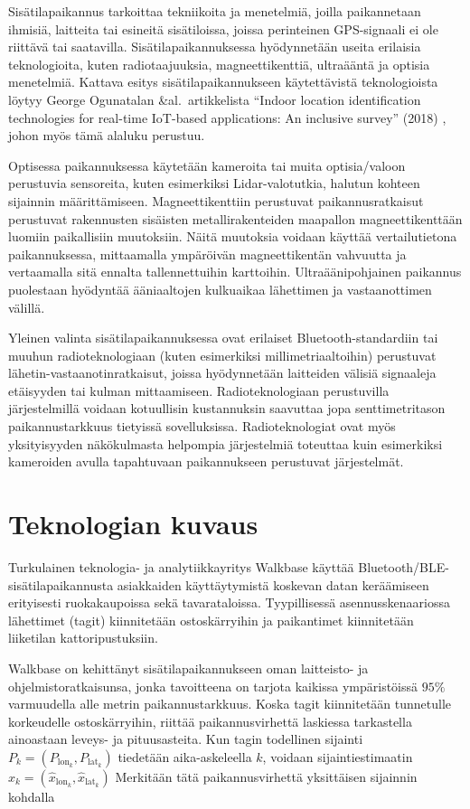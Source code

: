 \documentclass[
  12pt,
  a4paper, twoside]{book}
\begin{document}
Sisätilapaikannus tarkoittaa tekniikoita ja menetelmiä, joilla paikannetaan ihmisiä, laitteita tai esineitä sisätiloissa, joissa perinteinen GPS-signaali ei ole riittävä tai saatavilla. Sisätilapaikannuksessa hyödynnetään useita erilaisia teknologioita, kuten radiotaajuuksia, magneettikenttiä, ultraääntä ja optisia menetelmiä. Kattava esitys sisätilapaikannukseen käytettävistä teknologioista löytyy George Ogunatalan \&al.~artikkelista ``Indoor location identification technologies for real-time IoT-based applications: An inclusive survey'' (2018) \citep{oguntala-2018}, johon myös tämä alaluku perustuu.

Optisessa paikannuksessa käytetään kameroita tai muita optisia/valoon perustuvia sensoreita, kuten esimerkiksi Lidar-valotutkia, halutun kohteen sijainnin määrittämiseen. Magneettikenttiin perustuvat paikannusratkaisut perustuvat rakennusten sisäisten metallirakenteiden maapallon magneettikenttään luomiin paikallisiin muutoksiin. Näitä muutoksia voidaan käyttää vertailutietona paikannuksessa, mittaamalla ympäröivän magneettikentän vahvuutta ja vertaamalla sitä ennalta tallennettuihin karttoihin. Ultraäänipohjainen paikannus puolestaan hyödyntää ääniaaltojen kulkuaikaa lähettimen ja vastaanottimen välillä.

Yleinen valinta sisätilapaikannuksessa ovat erilaiset Bluetooth-standardiin tai muuhun radioteknologiaan (kuten esimerkiksi millimetriaaltoihin) perustuvat lähetin-vastaanotinratkaisut, joissa hyödynnetään laitteiden välisiä signaaleja etäisyyden tai kulman mittaamiseen. Radioteknologiaan perustuvilla järjestelmillä voidaan kotuullisin kustannuksin saavuttaa jopa senttimetritason paikannustarkkuus tietyissä sovelluksissa. Radioteknologiat ovat myös yksityisyyden näkökulmasta helpompia järjestelmiä toteuttaa kuin esimerkiksi kameroiden avulla tapahtuvaan paikannukseen perustuvat järjestelmät.

\section{Teknologian kuvaus}

Turkulainen teknologia- ja analytiikkayritys Walkbase käyttää Bluetooth/BLE-sisätilapaikannusta asiakkaiden käyttäytymistä koskevan datan keräämiseen erityisesti ruokakaupoissa sekä tavarataloissa. Tyypillisessä asennusskenaariossa lähettimet (tagit) kiinnitetään ostoskärryihin ja paikantimet kiinnitetään liiketilan kattoripustuksiin.

Walkbase on kehittänyt sisätilapaikannukseen oman laitteisto- ja ohjelmistoratkaisunsa, jonka tavoitteena on tarjota kaikissa ympäristöissä \(95\%\) varmuudella alle metrin paikannustarkkuus. Koska tagit kiinnitetään tunnetulle korkeudelle ostoskärryihin, riittää paikannusvirhettä laskiessa tarkastella ainoastaan leveys- ja pituusasteita. Kun tagin todellinen sijainti \(P_k=(P_{\text{lon}_k}, P_{\text{lat}_k})\) tiedetään aika-askeleella \(k\), voidaan sijaintiestimaatin \(\hat{x}_k=(\hat{x}_{\text{lon}_k}, \hat{x}_{\text{lat}_k})\) Merkitään tätä paikannusvirhettä yksittäisen sijainnin kohdalla
\end{document}
